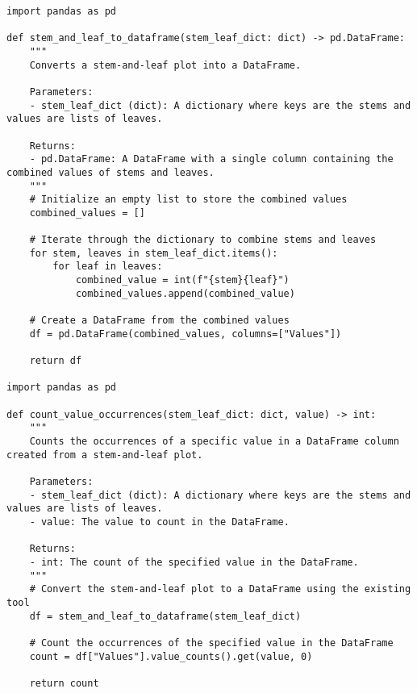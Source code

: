 \begin{tcolorbox}[title=Tools for TabMWP, width=\textwidth,top=0mm, breakable]
\begin{Verbatim}[breaklines=true, breakanywhere=true, fontsize=\footnotesize]
import pandas as pd

def stem_and_leaf_to_dataframe(stem_leaf_dict: dict) -> pd.DataFrame:
    """
    Converts a stem-and-leaf plot into a DataFrame.

    Parameters:
    - stem_leaf_dict (dict): A dictionary where keys are the stems and values are lists of leaves.

    Returns:
    - pd.DataFrame: A DataFrame with a single column containing the combined values of stems and leaves.
    """
    # Initialize an empty list to store the combined values
    combined_values = []

    # Iterate through the dictionary to combine stems and leaves
    for stem, leaves in stem_leaf_dict.items():
        for leaf in leaves:
            combined_value = int(f"{stem}{leaf}")
            combined_values.append(combined_value)

    # Create a DataFrame from the combined values
    df = pd.DataFrame(combined_values, columns=["Values"])
    
    return df

import pandas as pd

def count_value_occurrences(stem_leaf_dict: dict, value) -> int:
    """
    Counts the occurrences of a specific value in a DataFrame column created from a stem-and-leaf plot.

    Parameters:
    - stem_leaf_dict (dict): A dictionary where keys are the stems and values are lists of leaves.
    - value: The value to count in the DataFrame.

    Returns:
    - int: The count of the specified value in the DataFrame.
    """
    # Convert the stem-and-leaf plot to a DataFrame using the existing tool
    df = stem_and_leaf_to_dataframe(stem_leaf_dict)
    
    # Count the occurrences of the specified value in the DataFrame
    count = df["Values"].value_counts().get(value, 0)
    
    return count
\end{Verbatim}
\end{tcolorbox}